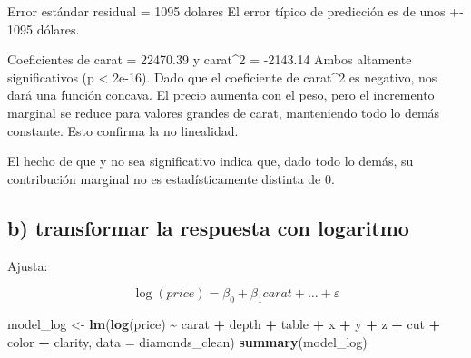 \documentclass[
  spanish,
]{article}
\newenvironment{Shaded}{\begin{snugshade}}{\end{snugshade}}
\newcommand{\AttributeTok}[1]{\textcolor[rgb]{0.13,0.29,0.53}{#1}}
\newcommand{\FunctionTok}[1]{\textcolor[rgb]{0.13,0.29,0.53}{\textbf{#1}}}
\newcommand{\NormalTok}[1]{#1}
\newcommand{\OtherTok}[1]{\textcolor[rgb]{0.56,0.35,0.01}{#1}}
\newcommand{\SpecialCharTok}[1]{\textcolor[rgb]{0.81,0.36,0.00}{\textbf{#1}}}
\begin{document}
Error estándar residual = 1095 dolares El error típico de predicción es
de unos +- 1095 dólares.

Coeficientes de carat = 22470.39 y carat\^{}2 = -2143.14 Ambos altamente
significativos (p \textless{} 2e-16). Dado que el coeficiente de
carat\^{}2 es negativo, nos dará una función concava. El precio aumenta
con el peso, pero el incremento marginal se reduce para valores grandes
de carat, manteniendo todo lo demás constante. Esto confirma la no
linealidad.

El hecho de que y no sea significativo indica que, dado todo lo demás,
su contribución marginal no es estadísticamente distinta de 0.

\subsection*{b) transformar la respuesta con
logaritmo}\label{b-transformar-la-respuesta-con-logaritmo}

Ajusta:

\[
\log(price) = \beta_0 + \beta_1 carat + \ldots + \varepsilon
\]

\begin{Shaded}
\begin{Highlighting}[]
\NormalTok{model\_log }\OtherTok{\textless{}{-}} \FunctionTok{lm}\NormalTok{(}\FunctionTok{log}\NormalTok{(price) }\SpecialCharTok{\textasciitilde{}}\NormalTok{ carat }\SpecialCharTok{+}\NormalTok{ depth }\SpecialCharTok{+}\NormalTok{ table }\SpecialCharTok{+}\NormalTok{ x }\SpecialCharTok{+}\NormalTok{ y }\SpecialCharTok{+}\NormalTok{ z }\SpecialCharTok{+}\NormalTok{ cut }\SpecialCharTok{+}\NormalTok{ color }\SpecialCharTok{+}\NormalTok{ clarity, }\AttributeTok{data =}\NormalTok{ diamonds\_clean)}
\FunctionTok{summary}\NormalTok{(model\_log)}
\end{Highlighting}
\end{Shaded}
\end{document}
